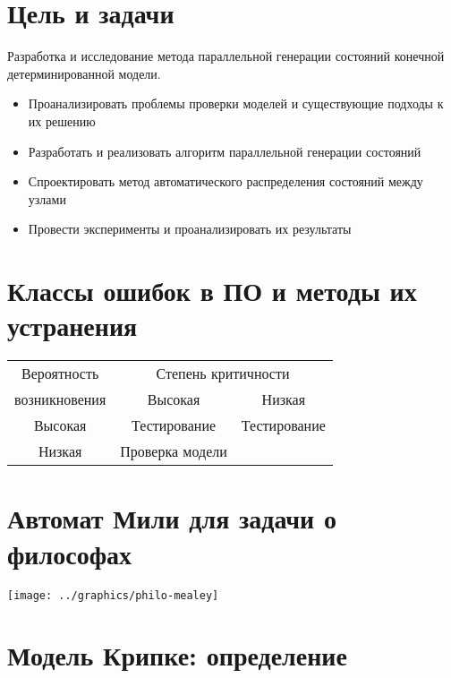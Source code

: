 \documentclass[12pt]{article}
\begin{document}
\TitleSlide

\section{Цель и задачи}
\label{sec:goal-tasks}

Разработка и исследование метода параллельной генерации состояний конечной
детерминированной модели.

\small
\begin{itemize}
\item Проанализировать проблемы проверки моделей и существующие подходы к их решению
\item Разработать и реализовать алгоритм параллельной генерации состояний
\item Спроектировать метод автоматического распределения состояний между узлами
\item Провести эксперименты и проанализировать их результаты
\end{itemize}
\normalsize

\section{Классы ошибок в ПО и методы их устранения}
\label{sec:error-classes}

\begin{center}
  \begin{tabular}{|c|c|c|} \hline Вероятность & \multicolumn{2}{|c|}{Степень критичности}
    \\ \cline{2-3} возникновения & Высокая & Низкая \\ \hline
    Высокая & Тестирование & Тестирование \\ \hline Низкая & Проверка модели & \\
    \hline
  \end{tabular}
\end{center}

\section{Автомат Мили для задачи о философах}
\label{sec:mealey}

\begin{center}
  \texttt{[image: ../graphics/philo-mealey]}
\end{center}

\section{Модель Крипке: определение}
\label{sec:kripke-def}
\end{document}
